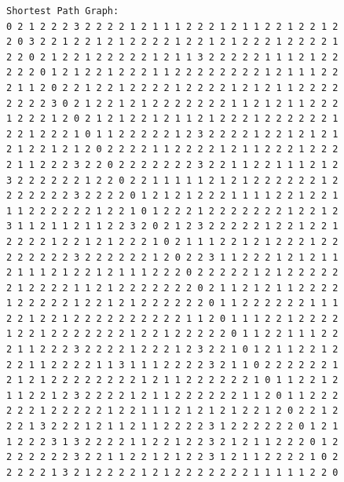 \documentclass[11pt]{article}
\begin{document}
\begin{lstlisting}
Shortest Path Graph:
0 2 1 2 2 2 3 2 2 2 2 1 2 1 1 1 2 2 2 1 2 1 1 2 2 1 2 2 1 2
2 0 3 2 2 1 2 2 1 2 1 2 2 2 2 1 2 2 1 2 1 2 2 2 1 2 2 2 2 1
2 2 0 2 1 2 2 1 2 2 2 2 2 1 2 1 1 3 2 2 2 2 2 1 1 1 2 1 2 2
2 2 2 0 1 2 1 2 2 1 2 2 2 1 1 2 2 2 2 2 2 2 2 1 2 1 1 1 2 2
2 1 1 2 0 2 2 1 2 2 1 2 2 2 2 1 2 2 2 2 1 2 1 2 1 1 2 2 2 2
2 2 2 2 3 0 2 1 2 2 1 2 1 2 2 2 2 2 2 2 1 1 2 1 2 1 1 2 2 2
1 2 2 2 1 2 0 2 1 2 1 2 2 1 2 1 1 2 1 2 2 2 1 2 2 2 2 2 2 1
2 2 1 2 2 2 1 0 1 1 2 2 2 2 2 1 2 3 2 2 2 2 1 2 2 1 2 1 2 1
2 1 2 2 1 2 1 2 0 2 2 2 2 1 1 2 2 2 2 1 2 1 1 2 2 2 1 2 2 2
2 1 1 2 2 2 3 2 2 0 2 2 2 2 2 2 2 3 2 2 1 1 2 2 1 1 1 2 1 2
3 2 2 2 2 2 2 1 2 2 0 2 2 1 1 1 1 1 2 1 2 1 2 2 2 2 2 2 1 2
2 2 2 2 2 2 3 2 2 2 2 0 1 2 1 2 1 2 2 2 1 1 1 1 2 2 1 2 2 1
1 1 2 2 2 2 2 2 1 2 2 1 0 1 2 2 2 1 2 2 2 2 2 2 2 1 2 2 1 2
3 1 1 2 1 1 2 1 1 2 2 3 2 0 2 1 2 3 2 2 2 2 2 1 2 2 1 2 2 1
2 2 2 2 1 2 2 1 2 1 2 2 2 1 0 2 1 1 1 2 2 1 2 1 2 2 2 1 2 2
2 2 2 2 2 2 3 2 2 2 2 2 2 1 2 0 2 2 3 1 1 2 2 2 1 2 1 2 1 1
2 1 1 1 2 1 2 2 1 2 1 1 1 2 2 2 0 2 2 2 2 2 1 2 1 2 2 2 2 2
2 1 2 2 2 2 1 1 2 1 2 2 2 2 2 2 2 0 2 1 1 2 1 2 1 1 2 2 2 2
1 2 2 2 2 2 1 2 2 1 2 1 2 2 2 2 2 2 0 1 1 2 2 2 2 2 2 1 1 1
2 2 1 2 2 1 2 2 2 2 2 2 2 2 2 2 1 1 2 0 1 1 1 2 2 1 2 2 2 2
1 2 2 1 2 2 2 2 2 2 2 1 2 2 1 2 2 2 2 2 0 1 1 2 2 1 1 1 2 2
2 1 1 2 2 2 3 2 2 2 2 1 2 2 2 1 2 3 2 2 1 0 1 2 1 1 2 2 1 2
2 2 1 1 2 2 2 2 1 1 3 1 1 1 2 2 2 2 3 2 1 1 0 2 2 2 2 2 2 1
2 1 2 1 2 2 2 2 2 2 2 2 1 2 1 1 2 2 2 2 2 2 1 0 1 1 2 2 1 2
1 1 2 2 1 2 3 2 2 2 2 1 2 1 1 2 2 2 2 2 2 1 1 2 0 1 1 2 2 2
2 2 2 1 2 2 2 2 2 1 2 2 1 1 1 2 1 2 1 2 1 2 2 1 2 0 2 2 1 2
2 2 1 3 2 2 2 1 2 1 1 2 1 1 2 2 2 2 3 1 2 2 2 2 2 2 0 1 2 1
1 2 2 2 3 1 3 2 2 2 2 1 1 2 2 1 2 2 3 2 1 2 1 1 2 2 2 0 1 2
2 2 2 2 2 2 3 2 2 1 1 2 2 1 2 1 2 2 3 1 2 1 1 2 2 2 2 1 0 2
2 2 2 2 1 3 2 1 2 2 2 2 1 2 1 2 2 2 2 2 2 2 1 1 1 1 1 2 2 0


\end{lstlisting}
\end{document}
